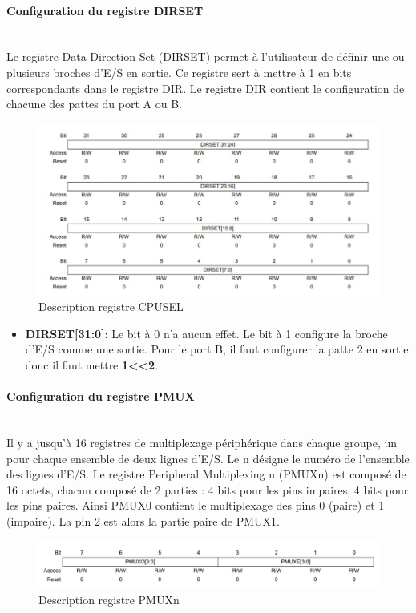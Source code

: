 \documentclass[a4paper]{article}
\begin{document}
	\paragraph{Configuration du registre DIRSET} 
	~~\\
	Le registre Data Direction Set (DIRSET) permet à l'utilisateur de définir une ou plusieurs broches d'E/S en sortie. Ce registre sert à mettre à 1 en bits correspondants dans le registre DIR. Le registre DIR contient le configuration de chacune des pattes du port A ou B.
	\begin{figure}[H]
		\centering
		\includegraphics[width=0.92\linewidth]{DIRSET.jpg}
		\caption{Description registre CPUSEL}
	\end{figure}
	\begin{itemize}
		\item {\bf DIRSET[31:0]}: Le bit à 0 n'a aucun effet. Le bit à 1 configure la broche d'E/S comme une sortie. Pour le port B, il faut configurer la patte 2 en sortie donc il faut mettre {\bf 1\textless\textless2}.
	\end{itemize}
	
	\paragraph{Configuration du registre PMUX} 
	~~\\
	Il y a jusqu'à 16 registres de multiplexage périphérique dans chaque groupe, un pour chaque ensemble de deux lignes d'E/S. Le n désigne le numéro de l'ensemble des lignes d'E/S.
	Le registre  Peripheral Multiplexing n (PMUXn) est composé de 16 octets, chacun composé de 2 parties : 4 bits pour les pins impaires, 4 bits pour les pins paires. Ainsi PMUX0 contient le multiplexage des pins 0 (paire) et 1 (impaire). La pin 2 est alors la partie paire de PMUX1.  
	\begin{figure}[H]
		\centering
		\includegraphics[width=0.9\linewidth]{PMUX.jpg}
		\caption{Description registre PMUXn}
	\end{figure}
	
\end{document}
